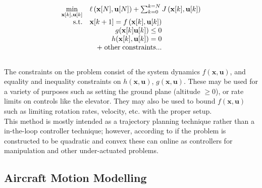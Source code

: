 \documentclass[]{article}
\newcommand{\plant}{$f\left(\mathbf{x},\mathbf{u}\right)$}
\begin{document}
	\begin{equation} \label{eq:traj-optimization-discrete-time}
		\begin{array}{rrclcl}
			\displaystyle \min_{\mathbf{x}[k],\mathbf{u}[k]} & \multicolumn{3}{l}{ \ell\left( \mathbf{x}[N],\mathbf{u}[N]\right) + \sum_{k=0}^{k=N} J\left( \mathbf{x}[k],\mathbf{u}[k]\right)}\\
			\textrm{s.t.} & \mathbf{x}[k+1] = f\left( \mathbf{x}[k], \mathbf{u}[k]\right)  \\
			 & g(\mathbf{x}[k] \mathbf{u}[k])\leq 0  \\
			& h(\mathbf{x}[k],\mathbf{u}[k] ) = 0\\
			& + \; \mathrm{other \; constraints}...\\
		\end{array}
	\end{equation}
	\\
	The constraints on the problem consist of the system dynamics $f\left(\mathbf{x},\mathbf{u}\right)$, and equality and inequality constraints on $h(\mathbf{x},\mathbf{u})$, $g(\mathbf{x},\mathbf{u})$. 
	These may be used for a variety of purposes such as setting the ground plane (altitude $\geq 0$), or rate limits on controls like the elevator. 
	They may also be used to bound \plant such as limiting rotation rates, velocity, etc. with the proper setup.
	\\
	This method is mostly intended as a trajectory planning technique rather than a in-the-loop controller technique; however, according to \cite{tedrake_underactuated_nodate} if the problem is constructed to be quadratic and convex these can online as controllers for manipulation and other under-actuated problems. 
	\\
	
	\subsection{Aircraft Motion Modelling} \label{sec:dynamics-model}
	
		
\end{document}
